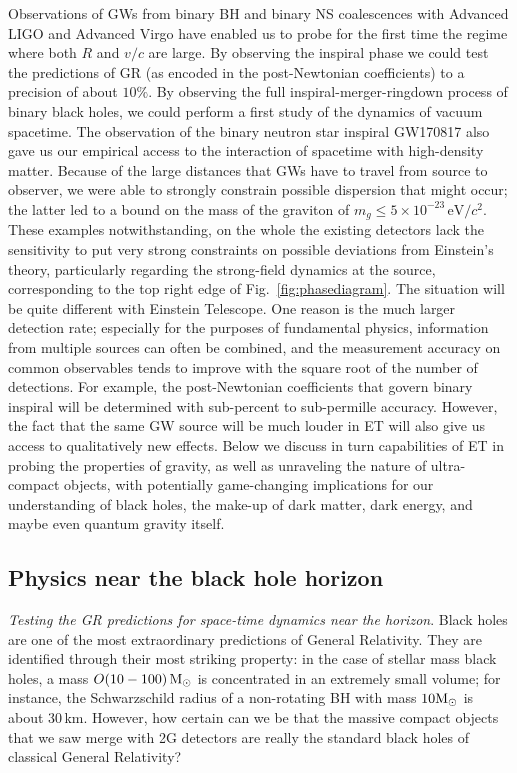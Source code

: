 Observations of GWs from binary BH and binary  NS coalescences with Advanced LIGO and Advanced Virgo have enabled us to probe for the first time the regime where both $R$ and $v/c$ are large. By observing the inspiral phase  we could test the predictions of GR (as encoded in the post-Newtonian coefficients) to a precision of about $10\%$.
By observing the full  inspiral-merger-ringdown process of binary black holes, we could perform a first study of the dynamics of vacuum spacetime. 
The observation of the binary neutron star inspiral GW170817 also gave us our empirical 
access to the interaction of spacetime with high-density matter. Because of the large 
distances that GWs have to travel from source to observer, we were able to
strongly constrain possible dispersion that might occur; the latter led to a bound on 
the mass of the graviton of $m_g \leq 5 \times 10^{-23}\,\mbox{eV}/c^2$. These examples
notwithstanding, on the whole the existing detectors lack the sensitivity to put very strong
constraints on possible deviations from Einstein's theory, particularly regarding 
the strong-field dynamics at the source, corresponding to the top right edge of 
Fig.~\ref{fig:phasediagram}. 
The situation will be quite different with Einstein Telescope. One reason is the much 
larger detection rate; especially for the purposes of fundamental physics, information 
from multiple sources can often be combined, and the measurement accuracy on 
common observables  
tends to improve with the square root of the number of detections. 
For example, the post-Newtonian coefficients that govern binary inspiral will be determined with sub-percent to sub-permille accuracy.
However, the fact that
the same GW source will be much louder in ET will also give us access to 
qualitatively new effects. Below we discuss in turn capabilities of ET in 
probing the properties of gravity, as well as unraveling the nature of ultra-compact
objects, with potentially game-changing implications for our understanding of black holes, 
the make-up of dark matter, dark energy, and maybe even quantum gravity itself.



\subsection{Physics near the black hole horizon}%



\emph{Testing the GR predictions for space-time dynamics near the horizon}.
Black holes are one of the most extraordinary predictions of General Relativity. They are identified through  their most striking property: in the case of stellar mass black holes, a mass $O(10-100)\,\mathrm{M}_{\odot}$ is concentrated in an extremely small volume; for instance, the Schwarzschild radius of a non-rotating BH with mass $10\mathrm{M}_{\odot}$ is about 30\,km. However, how certain can we be that the massive compact objects that we saw merge with 2G detectors are really the standard black holes of classical General Relativity?

